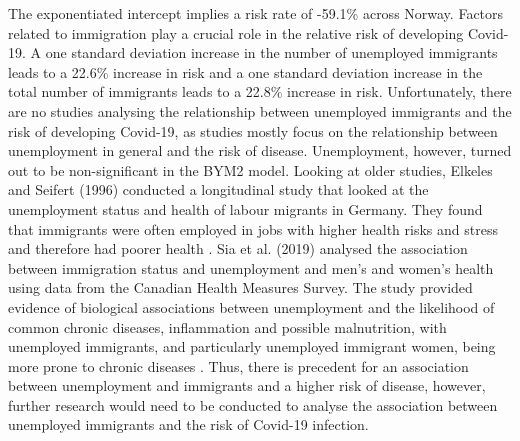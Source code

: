 The exponentiated intercept implies a risk rate of -59.1\% across Norway. Factors related to immigration play a crucial role in the relative risk of developing Covid-19. A one standard deviation increase in the number of unemployed immigrants leads to a 22.6\% increase in risk and a one standard deviation increase in the total number of immigrants leads to a 22.8\% increase in risk. Unfortunately, there are no studies analysing the relationship between unemployed immigrants and the risk of developing Covid-19, as studies mostly focus on the relationship between unemployment in general and the risk of disease. Unemployment, however, turned out to be non-significant in the BYM2 model. Looking at older studies, Elkeles and Seifert (1996) conducted a longitudinal study that looked at the unemployment status and health of labour migrants in Germany. They found that immigrants were often employed in jobs with higher health risks and stress and therefore had poorer health \autocite[][]{elkeles1996immigrants}. Sia et al. (2019) analysed the association between immigration status and unemployment and men's and women's health using data from the Canadian Health Measures Survey. The study provided evidence of biological associations between unemployment and the likelihood of common chronic diseases, inflammation and possible malnutrition, with unemployed immigrants, and particularly unemployed immigrant women, being more prone to chronic diseases \autocite[][]{sia2019chronic}. Thus, there is precedent for an association between unemployment and immigrants and a higher risk of disease, however, further research would need to be conducted to analyse the association between unemployed immigrants and the risk of Covid-19 infection. \\
